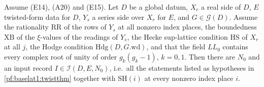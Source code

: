\begin{theorem}\label{pf:baselat1:inputs}
Assume (E14), (A20) and (E15). Let $D$ be a global datum, $X_r$ a real side of $D$, $E$ twisted-form data for $D$, $Y_s$ a
series side over $X_r$ for $E$, and $G\in\mathcal G(D)$. Assume the rationality $\mathrm{RR}$ of the rows of $Y_s$ at all
nonzero index places, the boundedness $\mathrm{XB}$ of the $\xi$-values of the readings of $Y_s$, the Hecke sup-lattice
condition $\mathrm{HS}$ of $X_r$ at all $j$, the Hodge condition $\mathrm{Hdg}(D,G.\mathrm{wd})$, and that the field
$\mathit{LL}_0$ contains every complex root of unity of order $g_k(g_k-1)$, $k=0,1$. Then there are $N_0$ and an input
record $I\in\mathcal I(D,E,N_0)$, i.e.\ all the statements listed as hypotheses in \cref{pf:baselat1:twistthm} together
with $\mathrm{SH}(i)$ at every nonzero index place $i$.
\end{theorem}


